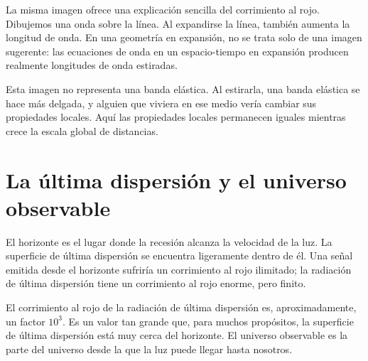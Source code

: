 La misma imagen ofrece una explicación sencilla del corrimiento al rojo. Dibujemos una onda sobre la línea. Al expandirse la línea, también aumenta la longitud de onda. En una geometría en expansión, no se trata solo de una imagen sugerente: las ecuaciones de onda en un espacio-tiempo en expansión producen realmente longitudes de onda estiradas.

\begin{classroomqa}
\end{classroomqa}

Esta imagen no representa una banda elástica. Al estirarla, una banda elástica se hace más delgada, y alguien que viviera en ese medio vería cambiar sus propiedades locales. Aquí las propiedades locales permanecen iguales mientras crece la escala global de distancias.

\section{La última dispersión y el universo observable}

El horizonte es el lugar donde la recesión alcanza la velocidad de la luz. La superficie de última dispersión se encuentra ligeramente dentro de él. Una señal emitida desde el horizonte sufriría un corrimiento al rojo ilimitado; la radiación de última dispersión tiene un corrimiento al rojo enorme, pero finito.

\begin{classroomqa}
\end{classroomqa}

El corrimiento al rojo de la radiación de última dispersión es, aproximadamente, un factor \(10^3\). Es un valor tan grande que, para muchos propósitos, la superficie de última dispersión está muy cerca del horizonte. El universo observable es la parte del universo desde la que la luz puede llegar hasta nosotros.

